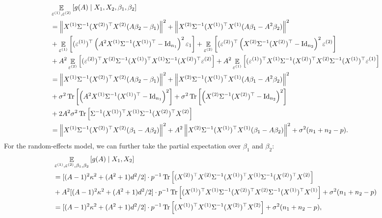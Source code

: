 \begin{align*}	
&\mathop{\mathbb{E}}_{\varepsilon^{(1)}, \varepsilon^{(2)}}\left[ g(A) \mid X_1, X_2 ,\beta_1,\beta_2 \right] \\
&= \left\| X^{(1)} \Sigma^{-1} (X^{(2)})^\top X^{(2)} (A\beta_2-\beta_1)\right\|^2 +\left\| X^{(2)} \Sigma^{-1} (X^{(1)})^\top X^{(1)} (A\beta_1-A^2\beta_2)\right\|^2  \\
& + \mathop{\mathbb{E}}_{\varepsilon^{(1)}}\left[ (\varepsilon^{(1)})^\top \left(A^2 X^{(1)}\Sigma^{-1} (X^{(1)})^\top-\operatorname{Id}_{n_1}\right)^2\varepsilon_1 \right] +\mathop{\mathbb{E}}_{ \varepsilon^{(2)}}\left[ (\varepsilon^{(2)})^\top \left(X^{(2)}\Sigma^{-1} (X^{(2)})^\top-\operatorname{Id}_{n_2}\right)^2\varepsilon^{(2)} \right]   \\
&+  A^2 \mathop{\mathbb{E}}_{ \varepsilon^{(2)}}\left[  (\varepsilon^{(2)} )^\top X^{(2)} \Sigma^{-1}  (X^{(1)})^\top X^{(1)}\Sigma^{-1} (X^{(2)})^\top \varepsilon^{(2)} \right]  +A^2 \mathop{\mathbb{E}}_{ \varepsilon^{(1)}}\left[  (\varepsilon^{(1)})^\top X^{(1)} \Sigma^{-1}  (X^{(2)})^\top X^{(2)}\Sigma^{-1} (X^{(1)})^\top \varepsilon^{(1)}   \right]\\
		&= \left\| X^{(1)} \Sigma^{-1} (X^{(2)})^\top X^{(2)} (A\beta_2-\beta_1)\right\|^2 +\left\| X^{(2)} \Sigma^{-1} (X^{(1)})^\top X^{(1)} (A\beta_1-A^2\beta_2)\right\|^2  \\
		&+ \sigma^2\operatorname{Tr}\left[ \left(A^2 X^{(1)}\Sigma^{-1} (X^{(1)})^\top-\operatorname{Id}_{n_1}\right)^2\right] +\sigma^2\operatorname{Tr}\left[ \left(X^{(2)}\Sigma^{-1} (X^{(2)})^\top-\operatorname{Id}_{n_2}\right)^2 \right]\\
&+ 2 A^2 \sigma^2 \operatorname{Tr}\left[ \Sigma^{-1}  (X^{(1)})^\top X^{(1)}\Sigma^{-1} (X^{(2)})^\top X^{(2)} \right]  \nonumber\\
		& = \left\| X^{(1)} \Sigma^{-1} (X^{(2)})^\top X^{(2)} (\beta_1-A\beta_2)\right\|^2 +A^2\left\| X^{(2)} \Sigma^{-1} (X^{(1)})^\top X^{(1)} (\beta_1-A\beta_2)\right\|^2 +\sigma^2(n_1+n_2-p).
\end{align*}
For the random-effects model, we can further take the partial expectation over $\beta_1$ and $\beta_2$: 
\begin{align}	
&\mathop{\mathbb{E}}_{\varepsilon^{(1)}, \varepsilon^{(2)} ,\beta_1,\beta_2}\left[ g(A) \mid X_1, X_2 \right] \nonumber\\
&=[(A-1)^2\kappa^2 + (A^2+1)d^2/2] \cdot p^{-1}\operatorname{Tr}\left[  (X^{(2)})^\top X^{(2)} \Sigma^{-1}(X^{(1)})^\top X^{(1)} \Sigma^{-1} (X^{(2)})^\top X^{(2)}\right] \nonumber\\
&+ A^2[(A-1)^2\kappa^2 + (A^2+1)d^2/2] \cdot p^{-1}\operatorname{Tr}\left[  (X^{(1)})^\top X^{(1)} \Sigma^{-1}(X^{(2)})^\top X^{(2)} \Sigma^{-1} (X^{(1)})^\top X^{(1)}\right] +\sigma^2(n_1+n_2-p) \nonumber\\
&=[(A-1)^2\kappa^2 + (A^2+1)d^2/2] \cdot p^{-1} \operatorname{Tr}\left[ (X^{(1)})^\top X^{(1)} \Sigma^{-1}(X^{(2)})^\top X^{(2)}\right]+\sigma^2(n_1+n_2-p), \label{EgA}
\end{align}
